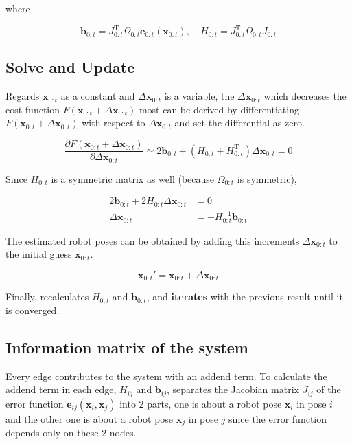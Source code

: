 \documentclass{article}
\begin{document}
where

\[
\bm{b}_{0:t} = J_{0:t}^{\mathrm{T}} \Omega_{0:t} \bm{e}_{0:t}(\bm{x}_{0:t}), \quad H_{0:t} = J_{0:t}^{\mathrm{T}} \Omega_{0:t} J_{0:t}
\]

\subsection{Solve and Update} \label{solveandupdate}

Regards $\bm{x}_{0:t}$ as a constant and ${\Delta\bm{x}}_{0:t}$ is a variable, the ${\Delta\bm{x}}_{0:t}$ which decreases the cost function $F(\bm{x}_{0:t} + \Delta\bm{x}_{0:t})$ most can be derived by differentiating $F(\bm{x}_{0:t} + \Delta\bm{x}_{0:t})$ with respect to ${\Delta\bm{x}}_{0:t}$ and set the differential as zero.

\[
\frac{\partial F(\bm{x}_{0:t} + \Delta\bm{x}_{0:t})}{\partial \Delta\bm{x}_{0:t}} \simeq
2\bm{b}_{0:t} + (H_{0:t} + H_{0:t}^{\mathrm{T}})\Delta\bm{x}_{0:t} =
0
\]

Since $H_{0:t}$ is a symmetric matrix as well (because $\Omega_{0:t}$ is symmetric),

\[
\begin{align}
2\bm{b}_{0:t} + 2H_{0:t}\Delta\bm{x}_{0:t} &= 0 \\
\Delta\bm{x}_{0:t} &= -H_{0:t}^{-1} \bm{b}_{0:t}
\end{align}
\]

The estimated robot poses can be obtained by adding this increments $\Delta\bm{x}_{0:t}$ to the initial guess $\bm{x}_{0:t}$.

\[
\bm{x}_{0:t}' = \bm{x}_{0:t} + \Delta\bm{x}_{0:t}
\]

Finally, recalculates $H_{0:t}$ and $\bm{b}_{0:t}$, and \textbf{iterates} with the previous result until it is converged.

\newpage

\subsection{Information matrix of the system}

Every edge contributes to the system with an addend term.
To calculate the addend term in each edge, $H_{ij}$ and $\bm{b}_{ij}$, separates the Jacobian matrix $J_{ij}$ of the error function $\bm{e}_{ij}(\bm{x}_i, \bm{x}_j)$ into 2 parts, one is about a robot pose $\bm{x}_i$ in pose $i$ and the other one is about a robot pose $\bm{x}_j$ in pose $j$ since the error function depends only on these 2 nodes.
\end{document}
